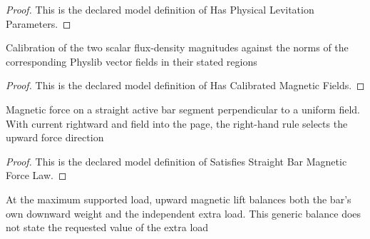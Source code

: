 \begin{proof}
  This is the declared model definition of Has Physical Levitation Parameters.
\end{proof}
\begin{definition}
  \label{def:physics:phyx-mini-0946:phyxminiproblems-problemphyxmini0946-hascalibratedmagneticfields}
  Calibration of the two scalar flux-density magnitudes against the norms of the corresponding Physlib vector fields in their stated regions
\end{definition}
\begin{proof}
  This is the declared model definition of Has Calibrated Magnetic Fields.
\end{proof}
\begin{definition}
  \label{def:physics:phyx-mini-0946:phyxminiproblems-problemphyxmini0946-satisfiesstraightbarmagneticforcelaw}
  Magnetic force on a straight active bar segment perpendicular to a uniform field. With current rightward and field into the page, the right-hand rule selects the upward force direction
\end{definition}
\begin{proof}
  This is the declared model definition of Satisfies Straight Bar Magnetic Force Law.
\end{proof}
\begin{definition}
  \label{def:physics:phyx-mini-0946:phyxminiproblems-problemphyxmini0946-satisfiesthresholdlevitationbalance}
  At the maximum supported load, upward magnetic lift balances both the bar's own downward weight and the independent extra load. This generic balance does not state the requested value of the extra load
\end{definition}
